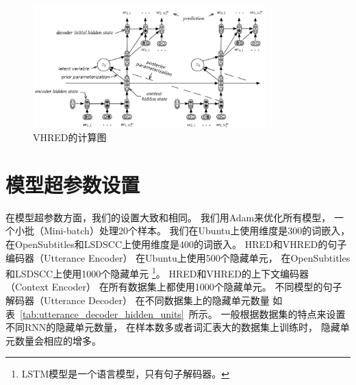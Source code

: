 \begin{figure}[H]
    \centering
    \includegraphics[width=0.8\textwidth]{figure/VHRED.png}
    \caption{VHRED的计算图}
    \label{fig:VHRED}
\end{figure}

\section{模型超参数设置}\label{sec:model_hparams}
在模型超参数方面，我们的设置大致和相同。
我们用Adam来优化所有模型，
一个小批（Mini-batch）处理20个样本。
我们在Ubuntu上使用维度是300的词嵌入，
在OpenSubtitles和LSDSCC上使用维度是400的词嵌入。
HRED和VHRED的句子编码器（Utterance Encoder）
在Ubuntu上使用500个隐藏单元，
在OpenSubtitles和LSDSCC上使用1000个隐藏单元
\footnote{LSTM模型是一个语言模型，只有句子解码器。}。
HRED和VHRED的上下文编码器（Context Encoder）
在所有数据集上都使用1000个隐藏单元。
不同模型的句子解码器（Utterance Decoder）
在不同数据集上的隐藏单元数量
如表~\ref{tab:utterance_decoder_hidden_units}~所示。
一般根据数据集的特点来设置不同RNN的隐藏单元数量，
在样本数多或者词汇表大的数据集上训练时，
隐藏单元数量会相应的增多。

